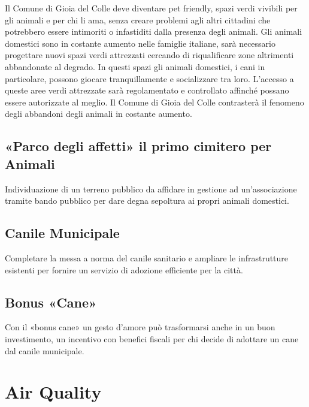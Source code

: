 \documentclass[a4paper,14pt,italian]{sphinxmanual}
\begin{document}
Il Comune di Gioia del Colle deve diventare pet friendly, spazi verdi vivibili per gli animali e per chi li ama, senza creare problemi agli altri cittadini che potrebbero essere intimoriti o infastiditi dalla presenza degli animali. Gli animali domestici sono in costante aumento nelle famiglie italiane, sarà necessario progettare nuovi spazi verdi attrezzati cercando di riqualificare zone altrimenti abbandonate al degrado. In questi spazi gli animali domestici, i cani in particolare, possono giocare tranquillamente e socializzare tra loro. L’accesso a queste aree verdi attrezzate sarà regolamentato e controllato affinché possano essere autorizzate al meglio.
Il Comune di Gioia del Colle contrasterà il fenomeno degli abbandoni degli animali in costante aumento.


\subsection{«Parco degli affetti» il primo cimitero per Animali}
\label{\detokenize{ambiente:parco-degli-affetti-il-primo-cimitero-per-animali}}
Individuazione di un terreno pubblico da affidare in gestione ad un’associazione tramite bando pubblico per dare degna sepoltura ai propri animali domestici.


\subsection{Canile Municipale}
\label{\detokenize{ambiente:canile-municipale}}
Completare la messa a norma del canile sanitario e ampliare le infrastrutture esistenti per fornire un servizio di adozione efficiente per la città.


\subsection{Bonus «Cane»}
\label{\detokenize{ambiente:bonus-cane}}
Con il «bonus cane» un gesto d’amore può trasformarsi anche in un buon investimento, un incentivo con benefici fiscali per chi decide di adottare un cane dal canile municipale.


\section{Air Quality}
\label{\detokenize{ambiente:air-quality}}
\end{document}

